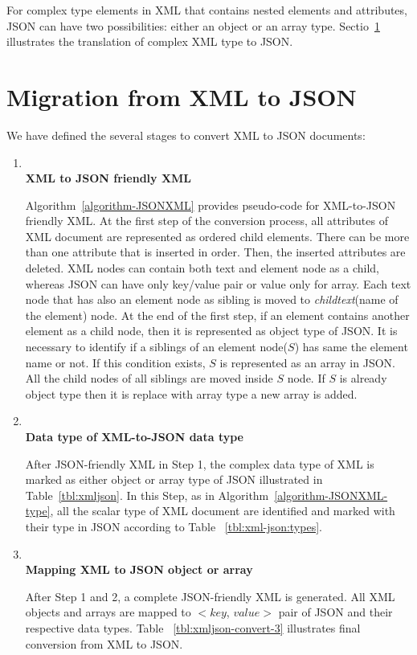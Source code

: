 For complex type elements in XML that contains nested elements and attributes, JSON can have two possibilities: either an object or an array type.  Sectio~\ref{xml-to-json-migration} illustrates the translation of complex XML type to JSON.

\section{Migration from XML to JSON}\label{xml-to-json-migration}
We have defined the several stages to convert XML to JSON documents:
\begin{enumerate}[label=\textbf{Step \arabic *.}]
	\item~\\
	\textbf{XML to JSON friendly XML}
	\par
	Algorithm~\ref{algorithm-JSONXML} provides pseudo-code for XML-to-JSON friendly XML. At the first step of the conversion process, all attributes of XML document are represented as ordered child elements. There can be more than one attribute that is inserted in order. Then, the inserted attributes are deleted.  XML nodes can contain both text and element node as a child, whereas JSON can have only key/value pair or value only for array. Each text node that  has also an element node as sibling is moved to \textit{childtext}(name of the element) node. At the end of the first step, if an element contains another element as a child node, then it is represented as object type of JSON. It is necessary to identify if a siblings of an element node($S$) has same the element name or not. If this condition exists, $S$ is represented as an array in JSON. All the child nodes of all siblings are moved inside $S$ node. If $S$ is already  object type  then it is replace with array type  a new array is added. %
	
	\item~\\
	\textbf{Data type of XML-to-JSON data type}
	\par
	After JSON-friendly XML in Step 1, the complex data type of XML is marked as either object or array type of JSON illustrated in Table~\ref{tbl:xmljson}. In this Step,  as in 
	Algorithm~\ref{algorithm-JSONXML-type}, all the scalar type of XML document are identified and marked with their type in JSON according to Table ~\ref{tbl:xml-json:types}.
	\item~\\
	\textbf{Mapping XML to JSON object or array}
	\par
	After Step 1 and 2, a complete JSON-friendly XML is generated. All XML objects and arrays are mapped to $<$$key$, $value$$>$ pair of JSON and their respective data types. Table ~\ref{tbl:xmljson-convert-3} illustrates final conversion from XML to JSON.
\end{enumerate}


